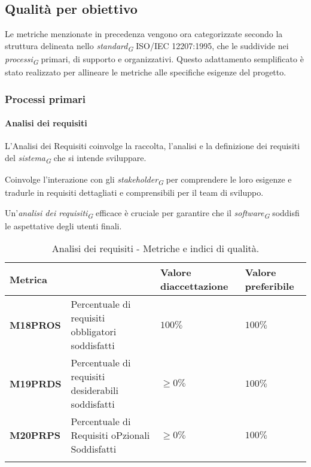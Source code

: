 \subsection{Qualità per obiettivo}
Le metriche menzionate in precedenza vengono ora categorizzate secondo la struttura delineata nello \textit{standard}\textsubscript{\textit{G}} ISO/IEC 12207:1995, che le suddivide nei \textit{processi}\textsubscript{\textit{G}} primari, di supporto e organizzativi. Questo adattamento semplificato è stato realizzato per allineare le metriche alle specifiche esigenze del progetto.

\subsubsection{Processi primari}
\paragraph{Analisi dei requisiti}
L'Analisi dei Requisiti coinvolge la raccolta, l'analisi e la definizione dei requisiti del \textit{sistema}\textsubscript{\textit{G}} che si intende sviluppare.

Coinvolge l'interazione con gli \textit{stakeholder}\textsubscript{\textit{G}} per comprendere le loro esigenze e tradurle in requisiti dettagliati e comprensibili per il team di sviluppo.

Un'\textit{analisi dei requisiti}\textsubscript{\textit{G}} efficace è cruciale per garantire che il \textit{software}\textsubscript{\textit{G}} soddisfi le aspettative degli utenti finali.

\vspace{0.4cm}

\begin{longtable}{|C{1.9cm}|L{4cm}|L{2.2cm}|L{2.1cm}|}
    \hline
    \textbf{Metrica} &  & \textbf{Valore di\linebreak accettazione} & {\textbf{Valore \linebreak preferibile}} \\
    \hline \hline
    
    \textbf{M18PROS} & Percentuale di requisiti obbligatori soddisfatti & $ 100\%$  & $ 100\%$ \\
    \hline

    \textbf{M19PRDS} & Percentuale di requisiti desiderabili soddisfatti & $\geq 0\%$ & $100\%$ \\
    \hline

    \textbf{M20PRPS} & Percentuale di Requisiti oPzionali Soddisfatti & $\geq 0\%$ & $100\%$ \\
    \hline

    \caption{Analisi dei requisiti - Metriche e indici di qualità.}
    \label{tab:analisi_requisiti_progetto}
\end{longtable}

